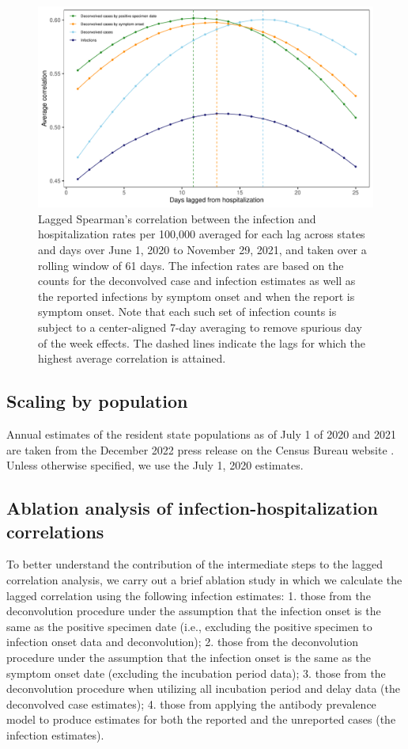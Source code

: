 \documentclass{article}
\begin{document}
\begin{figure}[!tb]
\centering
    \includegraphics[width=.75\textwidth]{adj_unadj_pi_no_inc_hosp_lag_corr_F24.pdf} 
    \caption{Lagged Spearman's correlation between the infection and
    hospitalization rates per 100,000 averaged for each lag across \US states
    and days over June 1, 2020 to November 29, 2021, and taken over a rolling
    window of 61 days. The infection rates are based on the counts for the
    deconvolved case and infection estimates as well as the reported infections
    by symptom onset and when the report is symptom onset. Note that each such
    set of infection counts is subject to a center-aligned 7-day averaging to
    remove spurious day of the week effects. The dashed lines indicate the lags
    for which the highest average correlation is attained.}
    \label{fig:abl_lag_cor}
\end{figure} %


\subsection{Scaling by population}

Annual estimates of the resident state
populations as of July 1 of 2020 and 2021 are taken from the December
2022 press release on the \US Census Bureau website \citep{uscensus2022annual}.
Unless otherwise specified, we use the July 1, 2020 estimates.


\subsection{Ablation analysis of infection-hospitalization correlations}

To better understand the contribution of the intermediate steps to the lagged
correlation analysis, we carry out a brief ablation study in which we calculate
the lagged correlation using the following infection estimates: 1. those from
the deconvolution procedure under the assumption that the infection onset is the
same as the positive specimen date (i.e., excluding the positive specimen to
infection onset data and deconvolution); 2. those from the deconvolution
procedure under the assumption that the infection onset is the same as the
symptom onset date (excluding the incubation period data); 3. those from the
deconvolution procedure when utilizing all incubation period and delay data (the
deconvolved case estimates); 4. those from applying the antibody prevalence
model to produce estimates for both the reported and the unreported cases (the
infection estimates).
\end{document}
